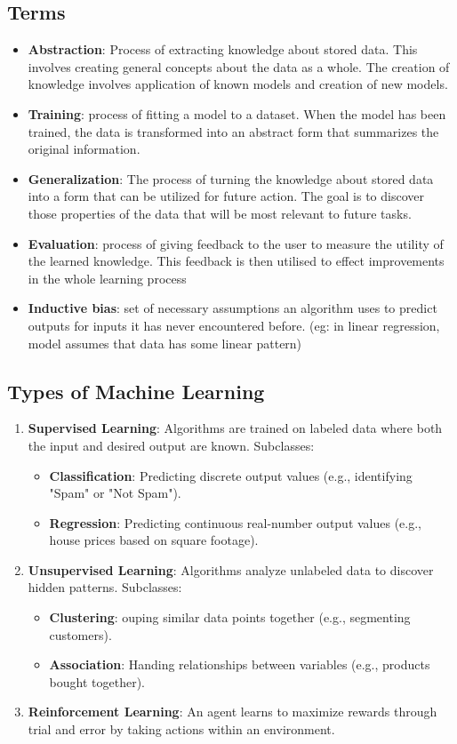 \documentclass[12pt]{article}
\begin{document}
\subsection{Terms}
\begin{itemize}
  \item \textbf{Abstraction}: Process of extracting knowledge about stored data. This involves creating general concepts about the data as a whole. The creation of knowledge involves application of known models and creation of new models.
  \item \textbf{Training}:  process of fitting a model to a dataset. When the model has been trained, the data is transformed into an abstract form that summarizes the original information.
  \item \textbf{Generalization}: The process of turning the knowledge about stored data into a form that can be utilized for future action. The goal is to discover those properties of the data that will be most relevant to future tasks.
  \item \textbf{Evaluation}: process of giving feedback to the user to measure the utility of the learned knowledge. This feedback is then utilised to effect improvements in the whole learning process
  \item \textbf{Inductive bias}: set of necessary assumptions an algorithm uses to predict outputs for inputs it has never encountered before. (eg: in linear regression, model assumes that data has some linear pattern)
\end{itemize}

\subsection{Types of Machine Learning}
\begin{enumerate}
  \item \textbf{Supervised Learning}: Algorithms are trained on labeled data where both the input and desired output are known. Subclasses:
    \begin{itemize}
      \item \textbf{Classification}: Predicting discrete output values (e.g., identifying "Spam" or "Not Spam").
      \item \textbf{Regression}: Predicting continuous real-number output values (e.g., house prices based on square footage).
    \end{itemize}
  \item \textbf{Unsupervised Learning}: Algorithms analyze unlabeled data to discover hidden patterns. Subclasses:
    \begin{itemize}
      \item \textbf{Clustering}: ouping similar data points together (e.g., segmenting customers).
      \item \textbf{Association}: Handing relationships between variables (e.g., products bought together).
    \end{itemize}
  \item \textbf{Reinforcement Learning}: An agent learns to maximize rewards through trial and error by taking actions within an environment.
\end{enumerate}
\end{document}
